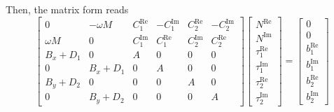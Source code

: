 \documentclass[11pt,a4paper]{article}
\begin{document}
Then, the matrix form reads
\begin{equation}
\begin{bmatrix}
0 & -\omega M & C_1^\mathrm{Re} & -C_1^\mathrm{Im} & C_2^\mathrm{Re} & -C_2^\mathrm{Im}\\[1ex]
\omega M & 0 & C_1^\mathrm{Im} & C_1^\mathrm{Re} & C_2^\mathrm{Im} & C_2^\mathrm{Re}\\[1ex]
B_x+D_1 & 0 & A & 0 & 0 & 0\\[1ex]
0 & B_x+D_1 & 0 & A & 0 & 0\\[1ex]
B_y+D_2 & 0 & 0 & 0 & A & 0\\[1ex]
0 & B_y+D_2 & 0 & 0 & 0 & A
\end{bmatrix}
\begin{bmatrix}
N^\mathrm{Re}\\[1ex]
N^\mathrm{Im}\\[1ex]
\tau_1^\mathrm{Re}\\[1ex]
\tau_1^\mathrm{Im}\\[1ex]
\tau_2^\mathrm{Re}\\[1ex]
\tau_2^\mathrm{Im}
\end{bmatrix}
=
\begin{bmatrix}
0\\[1ex]
0\\[1ex]
b_1^\mathrm{Re}\\[1ex]
b_1^\mathrm{Im}\\[1ex]
b_2^\mathrm{Re}\\[1ex]
b_2^\mathrm{Im}
\end{bmatrix}
\end{equation}



\end{document}
